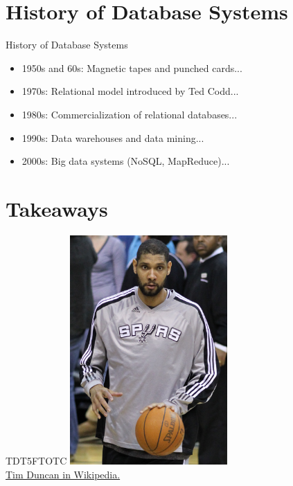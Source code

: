 \documentclass{beamer}
\begin{document}
\section{History of Database Systems}

\begin{frame}{History of Database Systems}
    \begin{itemize}
        \item 1950s and 60s: Magnetic tapes and punched cards...
        \item 1970s: Relational model introduced by Ted Codd...
        \item 1980s: Commercialization of relational databases...
        \item 1990s: Data warehouses and data mining...
        \item 2000s: Big data systems (NoSQL, MapReduce)...
    \end{itemize}
\end{frame}

\section*{Takeaways}

\begin{frame}{TDT5FTOTC}
    \centering
    \includegraphics[width=0.45\textwidth]{figures/td.jpg}\\
    \href{https://en.wikipedia.org/wiki/Tim_Duncan}{Tim Duncan in Wikipedia.}
\end{frame}
\end{document}
